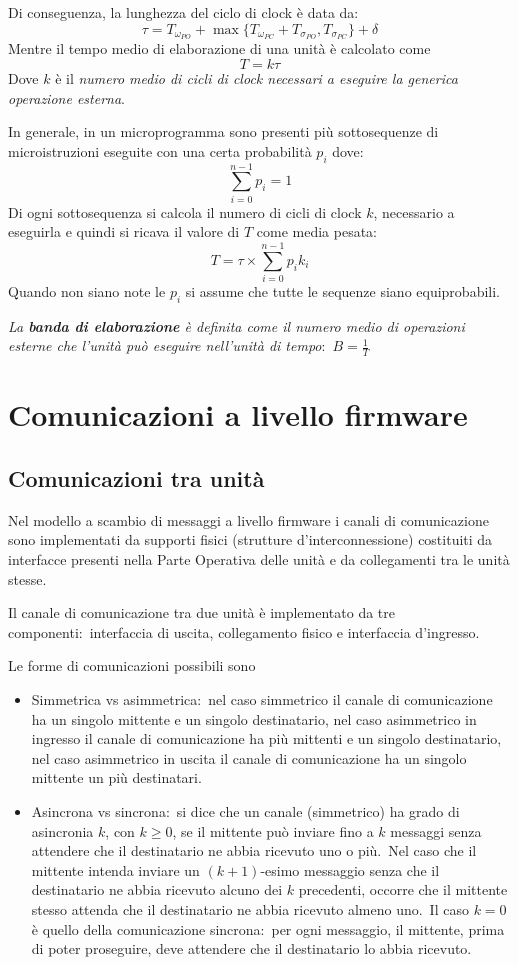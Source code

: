 Di conseguenza, la lunghezza del ciclo di clock è data da:
\[\tau = T_{{\omega}_{PO}} + \max\{ T_{{\omega}_{PC}} +  T_{{\sigma}_{PO}},  T_{{\sigma}_{PC}}\} + \delta\]
Mentre il tempo medio di elaborazione di una unità è calcolato come
\[T = k\tau\]
Dove $k$ è il \textit{numero medio di cicli di clock necessari a eseguire la generica operazione esterna}.

In generale, in un microprogramma sono presenti più sottosequenze di microistruzioni eseguite con una certa probabilità $p_i$ dove:
\[\sum^{n-1}_{i =0}p_i = 1\]
Di ogni sottosequenza si calcola il numero di cicli di clock $k$, necessario a eseguirla e quindi si ricava il valore di $T$ come media pesata:
\[T = \tau \times \sum^{n-1}_{i =0}p_ik_i\]
Quando non siano note le $p_i$ si assume che tutte le sequenze siano equiprobabili.

\textit{La \textbf{banda di elaborazione} è definita come il numero medio di operazioni esterne che l'unità può eseguire nell'unità di tempo}:\ $B = \frac{1}{T}$

\section{Comunicazioni a livello firmware}

\subsection{Comunicazioni tra unità}

Nel modello a scambio di messaggi a livello firmware i canali di comunicazione sono implementati da supporti fisici (strutture d'interconnessione) costituiti da interfacce presenti nella Parte Operativa delle unità e da collegamenti tra le unità stesse.

Il canale di comunicazione tra due unità è implementato da tre componenti:\ interfaccia di uscita, collegamento fisico e interfaccia d'ingresso.

Le forme di comunicazioni possibili sono
\begin{itemize}
    \item Simmetrica vs asimmetrica:\ nel caso simmetrico il canale di comunicazione ha un singolo mittente e un singolo destinatario, nel caso asimmetrico in ingresso il canale di comunicazione ha più mittenti e un singolo destinatario, nel caso asimmetrico in uscita il canale di comunicazione ha un singolo mittente un più destinatari.
    \item Asincrona vs sincrona:\ si dice che un canale (simmetrico) ha grado di asincronia $k$, con $k \geq 0$, se il mittente può inviare fino a $k$ messaggi senza attendere che il destinatario ne abbia ricevuto uno o più.\ Nel caso che il mittente intenda inviare un $(k+1)$-esimo messaggio senza che il destinatario ne abbia ricevuto alcuno dei $k$ precedenti, occorre che il mittente stesso attenda che il destinatario ne abbia ricevuto almeno uno.\ Il caso $k = 0$ è quello della comunicazione sincrona:\ per ogni messaggio, il mittente, prima di poter proseguire, deve attendere che il destinatario lo abbia ricevuto.
\end{itemize}

